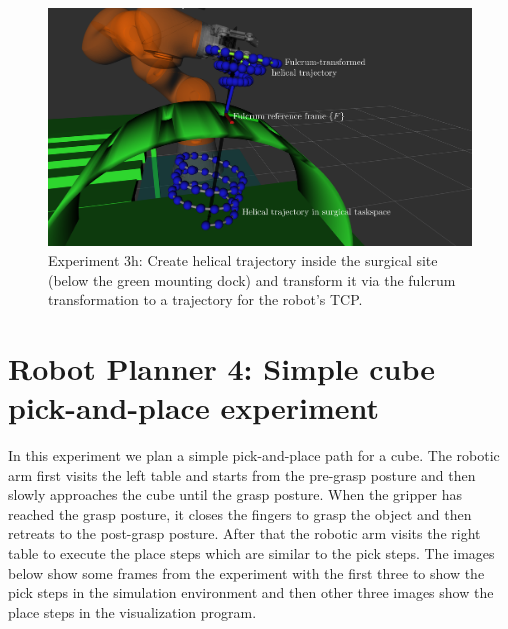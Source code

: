 \begin{center}
\begin{figure}[!htb]
\centering
\includegraphics[width=\textwidth]{images/robot_planner3/3h_helix.png}
\caption{Experiment 3h: Create helical trajectory inside the surgical site (below the green mounting dock) and transform it via the fulcrum transformation to a trajectory for the robot's TCP.}
\label{robot-planner3h-helix}
\end{figure}
\end{center}


\section{Robot Planner 4: Simple cube pick-and-place experiment}

In this experiment we plan a simple pick-and-place path for a cube. The robotic arm first visits the left table and starts from the pre-grasp posture and then 
slowly approaches the cube until the grasp posture. When the gripper has reached the grasp posture, it closes the fingers to grasp the object and then retreats 
to the post-grasp posture. After that the robotic arm visits the right table to execute the place steps which are similar to the pick steps. The images below 
show some frames from the experiment with the first three to show the pick steps in the simulation environment and then other three images show the place steps 
in the visualization program.

